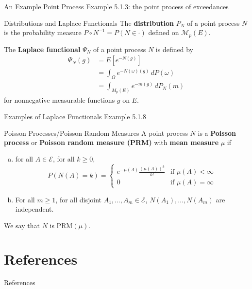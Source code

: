 \documentclass{beamer}
\begin{document}
\begin{frame}{An Example Point Process}
    Example 5.1.3: the point process of exceedances
\end{frame}

\begin{frame}{Distributions and Laplace Functionals}
    The \textbf{distribution} $P_N$ of a point process $N$ is the probability measure $P \circ N^{-1} = P(N \in \cdot)$ defined on $\mathcal{M}_p(E)$.

    \smallskip

    The \textbf{Laplace functional} $\Psi_N$ of a point process $N$ is defined by
    \begin{align*}
        \Psi_N(g) &= E[e^{-N(g)}] \\
        &= \int_{\Omega} e^{-N(\omega)(g)}\,dP(\omega) \\
        &= \int_{M_p(E)} e^{-m(g)}\,dP_N(m)
    \end{align*}
    for nonnegative measurable functions $g$ on $E$.
\end{frame}

\begin{frame}{Examples of Laplace Functionals}
    Example 5.1.8
\end{frame}

\begin{frame}{Poisson Processes/Poisson Random Measures}
    A point process $N$ is a \textbf{Poisson process} or \textbf{Poisson random measure (PRM)} with \textbf{mean measure} $\mu$ if
    \begin{enumerate}[(a)]
    \item for all $A \in \mathcal{E}$, for all $k \ge 0$,
    \[
    P(N(A) = k) =
        \begin{cases}
            e^{-\mu(A)}\frac{(\mu(A))^k}{k!} & \text{if $\mu(A) < \infty$} \\
            0 & \text{if $\mu(A) = \infty$}
        \end{cases}
    \]
    \item For all $m \ge 1$, for all disjoint $A_1, \ldots, A_m \in \mathcal{E}$, $N(A_1), \ldots, N(A_m)$ are independent.
    \end{enumerate}
    We say that $N$ is $\text{PRM}(\mu)$.
\end{frame}

\section{References}

\begin{frame}[allowframebreaks]{References}
    \nocite{*}
    \printbibliography
\end{frame}
\end{document}
